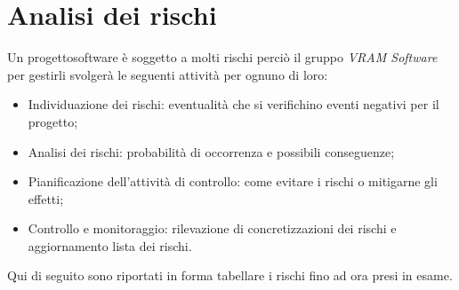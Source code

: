 \section{Analisi dei rischi}

Un progetto\glosp software è soggetto a molti rischi perciò il gruppo \textit{VRAM Software} per gestirli svolgerà le seguenti attività per ognuno di loro:

\begin{itemize}
	\item Individuazione dei rischi: eventualità che si verifichino eventi negativi per il progetto\glo;
	\item Analisi dei rischi: probabilità di occorrenza e possibili conseguenze;
	\item Pianificazione dell'attività di controllo: come evitare i rischi o mitigarne gli effetti;
	\item Controllo e monitoraggio: rilevazione di concretizzazioni dei rischi e aggiornamento lista dei rischi.
\end{itemize}

Qui di seguito sono riportati in forma tabellare i rischi fino ad ora presi in esame.
